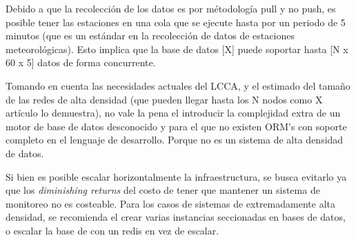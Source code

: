 Debido a que la recolección de los datos es por métodología pull y no push, es posible tener las estaciones en una cola que se ejecute hasta por un periodo de 5 minutos (que es un estándar en la recolección de datos de estaciones meteorológicas). Esto implica que la base de datos [X] puede soportar hasta [N x 60 x 5] datos de forma concurrente.

Tomando en cuenta las necesidades actuales del LCCA, y el estimado del tamaño de las redes de alta densidad (que pueden llegar hasta los N nodos como X artículo lo demuestra), no vale la pena el introducir la complejidad extra de un motor de base de datos desconocido y para el que no existen ORM's con soporte completo en el lenguaje de desarrollo. Porque no es un sistema de alta densidad de datos.

Si bien es posible escalar horizontalmente la infraestructura, se busca evitarlo ya que los \textit{diminishing returns} del costo de tener que mantener un sistema de monitoreo no es costeable. Para los casos de sistemas de extremadamente alta densidad, se recomienda el crear varias instancias seccionadas en bases de datos, o escalar la base de con un redis en vez de escalar.


